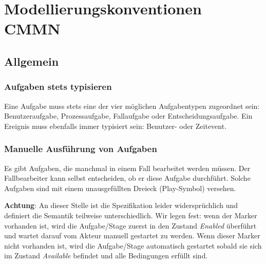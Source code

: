 \documentclass[12pt,report]{../../Templates/snetTeaching}
\begin{document}
\chapter{Modellierungskonventionen CMMN}




\section{Allgemein}





\subsection{Aufgaben stets typisieren}

Eine Aufgabe muss stets eine der vier möglichen Aufgabentypen zugeordnet sein: Benutzeraufgabe, Prozessaufgabe, Fallaufgabe oder Entscheidungsaufgabe. Ein Ereignis muss ebenfalls immer typisiert sein: Benutzer- oder Zeitevent.


\begin{RahmenNoFloat}
	\hfill
\end{RahmenNoFloat}




\subsection{Manuelle Ausführung von Aufgaben}

Es gibt Aufgaben, die manchmal in einem Fall bearbeitet werden müssen. Der Fallbearbeiter kann selbst entscheiden, ob er diese Aufgabe durchführt. Solche Aufgaben sind mit einem unausgefüllten Dreieck (Play-Symbol) versehen. 

\textbf{Achtung}: An dieser Stelle ist die Spezifikation leider widersprüchlich und definiert die Semantik teilweise unterschiedlich. Wir legen fest: wenn der Marker vorhanden ist, wird die Aufgabe/Stage zuerst in den Zustand \emph{Enabled} überführt und wartet darauf vom Akteur manuell gestartet zu werden. Wenn dieser Marker nicht vorhanden ist, wird die Aufgabe/Stage automatisch gestartet sobald sie sich im Zustand \emph{Available} befindet und alle Bedingungen erfüllt sind.
\end{document}
